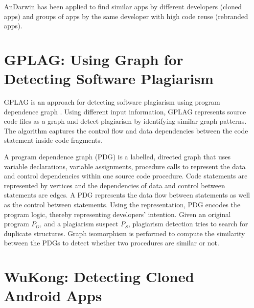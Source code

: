 AnDarwin has been applied to find similar apps by different developers (cloned apps) and groups of apps by the same developer with high code reuse (rebranded apps). 



\section{GPLAG: Using Graph for Detecting Software Plagiarism}\label{sec:gplag}

GPLAG is an approach for detecting software plagiarism using program dependence graph \cite{Liu:2006:GDS:1150402.1150522}. Using different input information, GPLAG represents source code files as a graph and detect plagiarism by identifying similar graph patterns. The algorithm captures the control flow and data dependencies between the code statement inside code fragments.

A program dependence graph (PDG) is a labelled, directed graph that uses variable declarations, variable assignments, procedure calls to represent the data and control dependencies within one source code procedure. Code statements are represented by vertices and the dependencies of data and control between statements are edges. A PDG represents the data flow between statements as well as the control between statements. Using the representation, PDG encodes the program logic, thereby representing developers' intention. Given an original program $P_{O}$, and a plagiarism suspect $P_{S}$, plagiarism detection tries to search for duplicate structures. Graph isomorphism is performed to compute the similarity between the PDGs to detect whether two procedures are similar or not. 


\section{WuKong: Detecting Cloned Android Apps}\label{sec:wukong}

